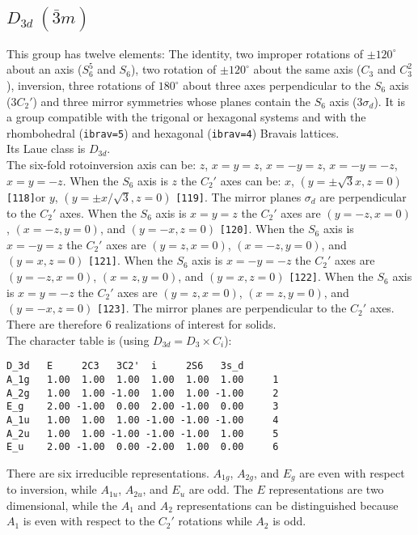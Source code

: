 \documentclass[12pt,a4paper]{article}
\begin{document}
\newpage
\subsection{\color{web-blue}$D_{3d}\ (\bar 3m)$} 
This group has twelve elements: The identity, two improper rotations 
of $\pm120^\circ$ about an axis ($S_6^5$ and $S_6$), two rotation of 
$\pm120^\circ$ about the same axis ($C_3$ and $C_3^2$), inversion,
three rotations of $180^\circ$ about three axes perpendicular to the 
$S_6$ axis ($3C_2'$) and three mirror symmetries whose planes contain 
the $S_6$ axis ($3\sigma_d$).
It is a group compatible with the trigonal or hexagonal systems and with the  
rhombohedral (\texttt{ibrav=5}) and hexagonal (\texttt{ibrav=4}) Bravais lattices. \\
Its Laue class is $D_{3d}$. \\
The six-fold rotoinversion axis can be: $z$, $x=y=z$, $x=-y=z$,
$x=-y=-z$, $x=y=-z$.
When the $S_6$ axis is $z$ the $C_2'$ axes can be:
$x$, $(y=\pm\sqrt{3}x, z=0)$ \texttt{[118]}or $y$, $(y=\pm x/\sqrt{3}, z=0)$
\texttt{[119]}. The mirror
planes $\sigma_d$ are perpendicular to the $C_2'$ axes.
When the $S_6$ axis is $x=y=z$ the $C_2'$ axes are $(y=-z, x=0)$, 
$(x=-z, y=0)$, and $(y=-x, z=0)$ \texttt{[120]}. 
When the $S_6$ axis is $x=-y=z$ 
the $C_2'$ axes are $(y=z, x=0)$, $(x=-z, y=0)$, and $(y=x, z=0)$
\texttt{[121]}. 
When the $S_6$ axis is $x=-y=-z$ the $C_2'$ axes are $(y=-z, x=0)$, 
$(x=z, y=0)$, and $(y=x, z=0)$ \texttt{[122]}. When the $S_6$ axis is 
$x=y=-z$ the $C_2'$ axes are $(y=z, x=0)$, $(x=z, y=0)$, and $(y=-x, z=0)$
\texttt{[123]}. The mirror planes are perpendicular to the $C_2'$ axes.
There are therefore $6$ realizations of interest for solids. \\
The character table is (using $D_{3d}=D_3 \times C_i$):
\begin{verbatim}
D_3d   E     2C3   3C2'  i     2S6   3s_d 
A_1g   1.00  1.00  1.00  1.00  1.00  1.00     1
A_2g   1.00  1.00 -1.00  1.00  1.00 -1.00     2
E_g    2.00 -1.00  0.00  2.00 -1.00  0.00     3
A_1u   1.00  1.00  1.00 -1.00 -1.00 -1.00     4
A_2u   1.00  1.00 -1.00 -1.00 -1.00  1.00     5
E_u    2.00 -1.00  0.00 -2.00  1.00  0.00     6
\end{verbatim}
There are six irreducible representations. $A_{1g}$, $A_{2g}$, and $E_g$
are even with respect to inversion, while $A_{1u}$, $A_{2u}$, and $E_u$ are
odd. The $E$ representations are two dimensional, while the $A_1$ and $A_2$
representations can be distinguished because $A_1$ is even with
respect to the $C_2'$ rotations while $A_2$ is odd. \\
\end{document}
